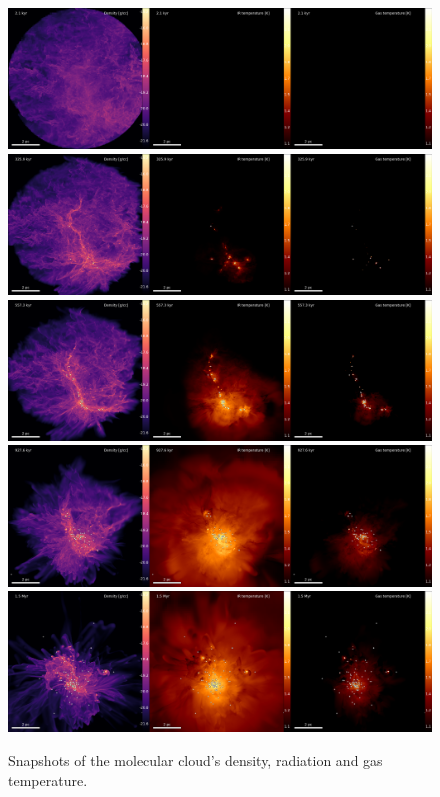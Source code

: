 \newpage
\thispagestyle{empty}
\begin{figure}[!htb]
 \centering
 \includegraphics[width=1.05\textwidth]{Figures/cloud_snapshots/multi_00000}
 \includegraphics[width=1.05\textwidth]{Figures/cloud_snapshots/multi_00175}
 \includegraphics[width=1.05\textwidth]{Figures/cloud_snapshots/multi_00300}
 \includegraphics[width=1.05\textwidth]{Figures/cloud_snapshots/multi_00500}
 \includegraphics[width=1.05\textwidth]{Figures/cloud_snapshots/multi_00800}
 \captionsetup{justification=justified,singlelinecheck=false,width=\linewidth}
 \decoRule
 \caption[Molecular cloud simulation snapshots]{Snapshots of the molecular cloud's density, radiation and gas temperature.}
 \label{fig:CloudPt3}
\end{figure}
\FloatBarrier


